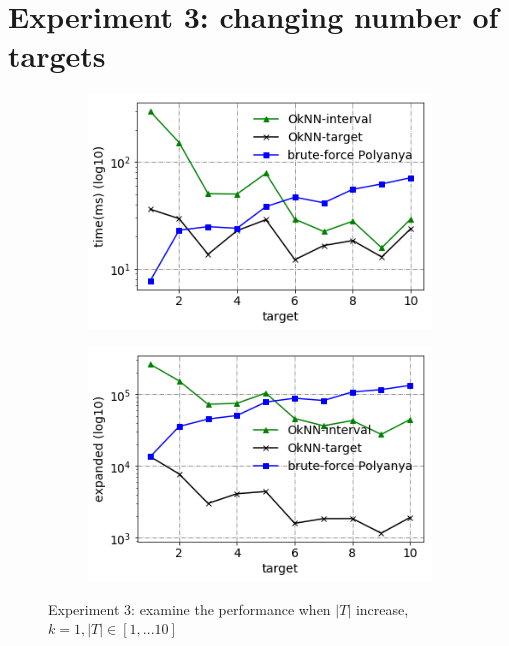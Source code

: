 \section{Experiment 3: changing number of targets}\label{exp3}

\begin{figure}[!htb]
    \centering
    \begin{subfigure}{0.5\textwidth}
        \centering
        \includegraphics[width=.9\textwidth]{pic/e3_time.png}
        \caption{}
        \label{e3_time}
    \end{subfigure}%
    \hfill
    \begin{subfigure}{0.5\textwidth}
        \centering
        \includegraphics[width=.9\textwidth]{pic/e3_gen.png}
        \caption{}
        \label{e3_gen}
    \end{subfigure}
    \caption{\small Experiment 3: examine the performance when $|T|$ increase, $k=1, |T| \in [1,...10]$}
\end{figure}

